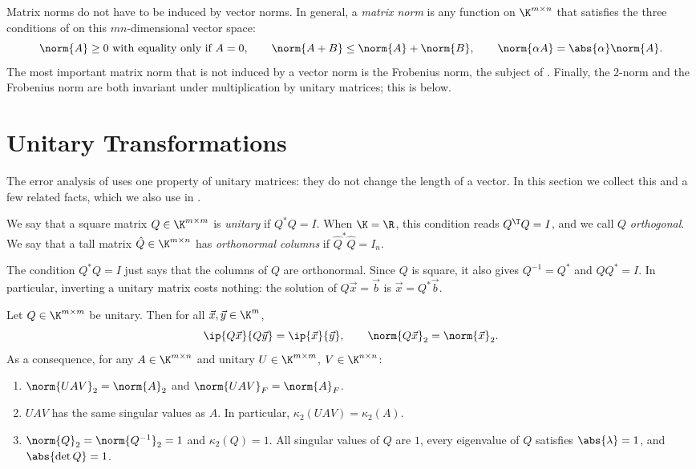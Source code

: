Matrix norms do not have to be induced by vector norms. In general, a \emph{matrix norm} is any function on $\K^{m \times n}$ that satisfies the three conditions of  on this $mn$-dimensional vector space:
\begin{equation}
  \norm{A} \ge 0 \text{ with equality only if } A = 0, \qquad \norm{A + B} \le \norm{A} + \norm{B}, \qquad \norm{\alpha A} = \abs{\alpha}\norm{A}.
\end{equation}
The most important matrix norm that is not induced by a vector norm is the Frobenius norm, the subject of . Finally, the $2$-norm and the Frobenius norm are both invariant under multiplication by unitary matrices; this is  below.

\section{Unitary Transformations}
\label{sec:unitary}

The error analysis of  uses one property of unitary matrices: they do not change the length of a vector. In this section we collect this and a few related facts, which we also use in .

\begin{definition}
  We say that a square matrix $Q \in \K^{m \times m}$ is \emph{unitary} if $Q^\ast Q = I$. When $\K = \R$, this condition reads $Q^\T Q = I$, and we call $Q$ \emph{orthogonal}. We say that a tall matrix $\hat{Q} \in \K^{m \times n}$ has \emph{orthonormal columns} if $\hat{Q}^\ast\hat{Q} = I_n$.
\end{definition}

The condition $Q^\ast Q = I$ just says that the columns of $Q$ are orthonormal. Since $Q$ is square, it also gives $Q^{-1} = Q^\ast$ and $QQ^\ast = I$. In particular, inverting a unitary matrix costs nothing: the solution of $Q\vec{x} = \vec{b}$ is $\vec{x} = Q^\ast\vec{b}$.

\begin{theorem}
  \label{thm:unitary}
  Let $Q \in \K^{m \times m}$ be unitary. Then for all $\vec{x}, \vec{y} \in \K^m$,
  \begin{equation}
    \ip{Q\vec{x}}{Q\vec{y}} = \ip{\vec{x}}{\vec{y}}, \qquad \norm{Q\vec{x}}_2 = \norm{\vec{x}}_2.
  \end{equation}
  As a consequence, for any $A \in \K^{m \times n}$ and unitary $U \in \K^{m \times m}$, $V \in \K^{n \times n}$:
  \begin{enumerate}
    \item $\norm{UAV}_2 = \norm{A}_2$ and $\norm{UAV}_F = \norm{A}_F$.
    \item $UAV$ has the same singular values as $A$. In particular, $\kappa_2(UAV) = \kappa_2(A)$.
    \item $\norm{Q}_2 = \norm{Q^{-1}}_2 = 1$ and $\kappa_2(Q) = 1$. All singular values of $Q$ are $1$, every eigenvalue of $Q$ satisfies $\abs{\lambda} = 1$, and $\abs{\det Q} = 1$.
  \end{enumerate}
\end{theorem}

